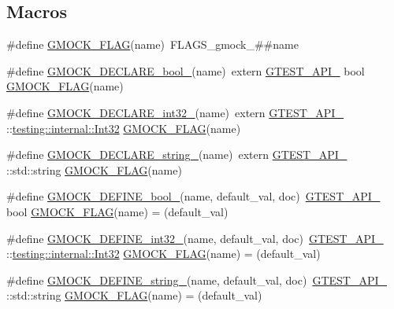 \subsection*{Macros}
\begin{DoxyCompactItemize}
\item 
\#define \mbox{\hyperlink{gmock-port_8h_ad7119adfef06be5e7b1551633f5a1436}{G\+M\+O\+C\+K\+\_\+\+F\+L\+AG}}(name)~F\+L\+A\+G\+S\+\_\+gmock\+\_\+\#\#name
\item 
\#define \mbox{\hyperlink{gmock-port_8h_a7a0a953221ea8ef5aaa6c644a48af599}{G\+M\+O\+C\+K\+\_\+\+D\+E\+C\+L\+A\+R\+E\+\_\+bool\+\_\+}}(name)~extern \mbox{\hyperlink{gtest-port_8h_aa73be6f0ba4a7456180a94904ce17790}{G\+T\+E\+S\+T\+\_\+\+A\+P\+I\+\_\+}} bool \mbox{\hyperlink{gmock-port_8h_ad7119adfef06be5e7b1551633f5a1436}{G\+M\+O\+C\+K\+\_\+\+F\+L\+AG}}(name)
\item 
\#define \mbox{\hyperlink{gmock-port_8h_adeb7f0a8d842d1d541615763835af3f9}{G\+M\+O\+C\+K\+\_\+\+D\+E\+C\+L\+A\+R\+E\+\_\+int32\+\_\+}}(name)~extern \mbox{\hyperlink{gtest-port_8h_aa73be6f0ba4a7456180a94904ce17790}{G\+T\+E\+S\+T\+\_\+\+A\+P\+I\+\_\+}} \+::\mbox{\hyperlink{namespacetesting_1_1internal_a8ee38faaf875f133358abaf9bc056cec}{testing\+::internal\+::\+Int32}} \mbox{\hyperlink{gmock-port_8h_ad7119adfef06be5e7b1551633f5a1436}{G\+M\+O\+C\+K\+\_\+\+F\+L\+AG}}(name)
\item 
\#define \mbox{\hyperlink{gmock-port_8h_a35af08c45131cf68d78446cb8cfe40fe}{G\+M\+O\+C\+K\+\_\+\+D\+E\+C\+L\+A\+R\+E\+\_\+string\+\_\+}}(name)~extern \mbox{\hyperlink{gtest-port_8h_aa73be6f0ba4a7456180a94904ce17790}{G\+T\+E\+S\+T\+\_\+\+A\+P\+I\+\_\+}} \+::std\+::string \mbox{\hyperlink{gmock-port_8h_ad7119adfef06be5e7b1551633f5a1436}{G\+M\+O\+C\+K\+\_\+\+F\+L\+AG}}(name)
\item 
\#define \mbox{\hyperlink{gmock-port_8h_a470be328fabbeef3987127adc18a1433}{G\+M\+O\+C\+K\+\_\+\+D\+E\+F\+I\+N\+E\+\_\+bool\+\_\+}}(name,  default\+\_\+val,  doc)~\mbox{\hyperlink{gtest-port_8h_aa73be6f0ba4a7456180a94904ce17790}{G\+T\+E\+S\+T\+\_\+\+A\+P\+I\+\_\+}} bool \mbox{\hyperlink{gmock-port_8h_ad7119adfef06be5e7b1551633f5a1436}{G\+M\+O\+C\+K\+\_\+\+F\+L\+AG}}(name) = (default\+\_\+val)
\item 
\#define \mbox{\hyperlink{gmock-port_8h_a19d91081ff0aaab2f60ef1dc2d6e6b34}{G\+M\+O\+C\+K\+\_\+\+D\+E\+F\+I\+N\+E\+\_\+int32\+\_\+}}(name,  default\+\_\+val,  doc)~\mbox{\hyperlink{gtest-port_8h_aa73be6f0ba4a7456180a94904ce17790}{G\+T\+E\+S\+T\+\_\+\+A\+P\+I\+\_\+}} \+::\mbox{\hyperlink{namespacetesting_1_1internal_a8ee38faaf875f133358abaf9bc056cec}{testing\+::internal\+::\+Int32}} \mbox{\hyperlink{gmock-port_8h_ad7119adfef06be5e7b1551633f5a1436}{G\+M\+O\+C\+K\+\_\+\+F\+L\+AG}}(name) = (default\+\_\+val)
\item 
\#define \mbox{\hyperlink{gmock-port_8h_ad6badbf90e5a813e2bd5668fc6b6a8f7}{G\+M\+O\+C\+K\+\_\+\+D\+E\+F\+I\+N\+E\+\_\+string\+\_\+}}(name,  default\+\_\+val,  doc)~\mbox{\hyperlink{gtest-port_8h_aa73be6f0ba4a7456180a94904ce17790}{G\+T\+E\+S\+T\+\_\+\+A\+P\+I\+\_\+}} \+::std\+::string \mbox{\hyperlink{gmock-port_8h_ad7119adfef06be5e7b1551633f5a1436}{G\+M\+O\+C\+K\+\_\+\+F\+L\+AG}}(name) = (default\+\_\+val)
\end{DoxyCompactItemize}


